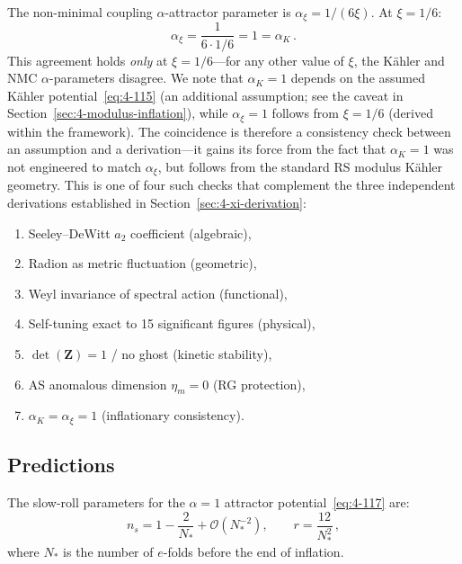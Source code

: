 The non-minimal coupling $\alpha$-attractor parameter is $\alpha_\xi = 1/(6\xi)$. At $\xi = 1/6$:
\begin{equation}
  \alpha_\xi = \frac{1}{6 \cdot 1/6} = 1 = \alpha_K\,.
  \label{eq:4-119}
\end{equation}
This agreement holds \emph{only} at $\xi = 1/6$---for any other value of $\xi$, the K\"ahler and NMC $\alpha$-parameters disagree. We note that $\alpha_K = 1$ depends on the assumed K\"ahler potential~\eqref{eq:4-115} (an additional assumption; see the caveat in Section~\ref{sec:4-modulus-inflation}), while $\alpha_\xi = 1$ follows from $\xi = 1/6$ (derived within the framework). The coincidence is therefore a consistency check between an assumption and a derivation---it gains its force from the fact that $\alpha_K = 1$ was not engineered to match $\alpha_\xi$, but follows from the standard RS modulus K\"ahler geometry. This is one of four such checks that complement the three independent derivations established in Section~\ref{sec:4-xi-derivation}:
\begin{enumerate}
  \item Seeley--DeWitt $a_2$ coefficient (algebraic),
  \item Radion as metric fluctuation (geometric),
  \item Weyl invariance of spectral action (functional),
  \item Self-tuning exact to 15 significant figures (physical),
  \item $\det(\mathbf{Z}) = 1$ / no ghost (kinetic stability),
  \item AS anomalous dimension $\eta_m = 0$ (RG protection),
  \item $\alpha_K = \alpha_\xi = 1$ (inflationary consistency).
\end{enumerate}

\subsection{Predictions}
\label{sec:4-inflation-predictions}

The slow-roll parameters for the $\alpha = 1$ attractor potential~\eqref{eq:4-117} are:
\begin{equation}
  n_s = 1 - \frac{2}{N_*} + \mathcal{O}(N_*^{-2}), \qquad
  r = \frac{12}{N_*^2}\,,
  \label{eq:4-120}
\end{equation}
where $N_*$ is the number of $e$-folds before the end of inflation.

